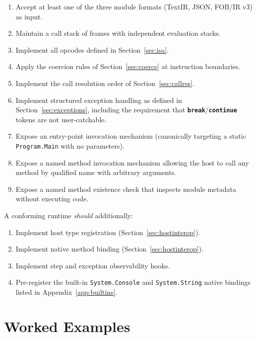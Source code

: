 \documentclass[11pt,a4paper]{article}
\newcommand{\opcode}[1]{\textbf{\texttt{#1}}}
\begin{document}
\begin{enumerate}[leftmargin=2em]
  \item Accept at least one of the three module formats
    (TextIR, JSON, FOB/IR v3) as input.
  \item Maintain a call stack of frames with independent evaluation stacks.
  \item Implement all opcodes defined in Section~\ref{sec:isa}.
  \item Apply the coercion rules of Section~\ref{sec:coerce} at instruction
    boundaries.
  \item Implement the call resolution order of Section~\ref{sec:callres}.
  \item Implement structured exception handling as defined in
    Section~\ref{sec:exceptions}, including the requirement that
    \opcode{break}/\opcode{continue} tokens are not user-catchable.
  \item Expose an entry-point invocation mechanism (canonically targeting a
    static \texttt{Program.Main} with no parameters).
  \item Expose a named method invocation mechanism allowing the host to call
    any method by qualified name with arbitrary arguments.
  \item Expose a named method existence check that inspects module metadata
    without executing code.
\end{enumerate}

A conforming runtime \textit{should} additionally:

\begin{enumerate}[leftmargin=2em, resume]
  \item Implement host type registration (Section~\ref{sec:hostinterop}).
  \item Implement native method binding (Section~\ref{sec:hostinterop}).
  \item Implement step and exception observability hooks.
  \item Pre-register the built-in \texttt{System.Console} and
    \texttt{System.String} native bindings listed in
    Appendix~\ref{app:builtins}.
\end{enumerate}

\section{Worked Examples}
\end{document}
